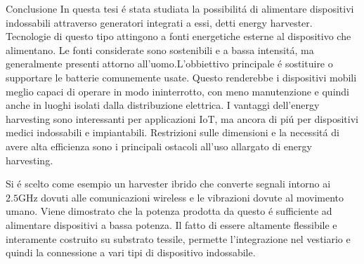 \documentclass[12pt,a4paper]{extreport}
\begin{document}
\begin{chapter}{Conclusione}
    In questa tesi \'e stata studiata la possibilit\'a di alimentare dispositivi indossabili attraverso generatori integrati a essi, detti energy harvester. Tecnologie di questo tipo attingono a fonti energetiche esterne al dispositivo che alimentano. Le fonti considerate sono sostenibili e a bassa intensit\'a, ma generalmente presenti attorno all'uomo.L'obbiettivo principale \'e sostituire o supportare le batterie comunemente usate. Questo renderebbe i dispositivi mobili meglio capaci di operare in modo ininterrotto, con meno manutenzione e quindi anche in luoghi isolati dalla distribuzione elettrica. I vantaggi dell'energy harvesting sono interessanti per applicazioni IoT, ma ancora di pi\'u per dispositivi medici indossabili e impiantabili. Restrizioni sulle dimensioni e la necessit\'a di avere alta efficienza sono i principali ostacoli all'uso allargato di energy harvesting.

    Si \'e scelto come esempio un harvester ibrido che converte segnali intorno ai \(2.5\mathrm{GHz}\) dovuti alle comunicazioni wireless e le vibrazioni dovute al movimento umano. Viene dimostrato che la potenza prodotta da questo \'e sufficiente ad alimentare dispositivi a bassa potenza. Il fatto di essere altamente flessibile e interamente costruito su substrato tessile, permette l'integrazione nel vestiario e quindi la connessione a vari tipi di dispositivo indossabile.  
\end{chapter}




\end{document}
